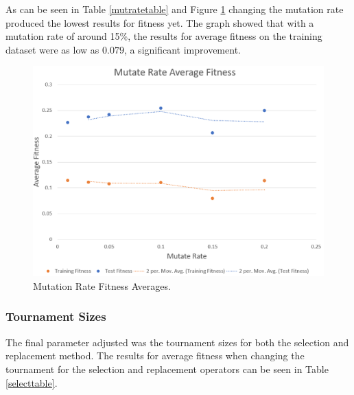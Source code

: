 \documentclass[sigconf]{acmart}
\begin{document}
As can be seen in Table \ref{mutratetable} and Figure \ref{mutategraph} changing the mutation rate produced the lowest results for fitness yet. The graph showed that with a mutation rate of around 15\%, the results for average fitness on the training dataset were as low as $0.079$, a significant improvement.

\begin{table}[!h]
	\caption{Mutation Rate Parameter Comparison}
	\label{mutratetable}
	\centering
\end{table}

\begin{figure}[!h]
	\centering
	\includegraphics[width=\columnwidth]{IMAGES/mutaterate}
	\caption{Mutation Rate Fitness Averages.}
	\label{mutategraph}
\end{figure}

\subsubsection{Tournament Sizes}
The final parameter adjusted was the tournament sizes for both the selection and replacement method. The results for average fitness when changing the tournament for the selection and replacement operators can be seen in Table \ref{selecttable}.
\end{document}
